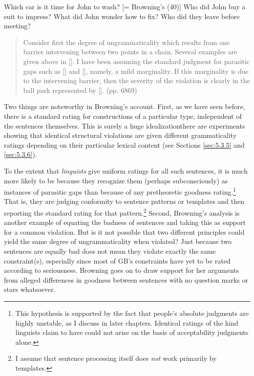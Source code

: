    
\label{ex:2:12}
\z

\ea \label{ex:2:13}
\ea
Which car is it time for John to wash? [= Browning's (40)]
\ex Who did John buy a suit to impress?
\ex What did John wonder how to fix?
\ex Who did they leave before meeting?\\
\z
\z

\begin{quote}
Consider first the degree of ungrammaticality which results from one barrier intervening between two points in a chain. Several examples are given above in []. I have been assuming the standard judgment for parasitic gaps such as [] and [], namely, a mild marginality. If this marginality is due to the intervening barrier, then the severity of the violation is clearly in the ball park represented by []. (pp. 68\textendash{}69)
\end{quote}

\noindent
Two things are noteworthy in Browning's account. First, as we have seen before, there is a standard rating for constructions of a particular type, independent of the sentences themselves. This is surely a huge idealization\schdash{}there are experiments showing that identical structural violations are given different grammaticality ratings depending on their particular lexical content (see Sections \ref{sec:5.3.5} and \ref{sec:5.3.6}).


To the extent that \textit{linguists} give uniform ratings for all such sentences, it is much more likely to be because they recognize them (perhaps subconsciously) as instances of parasitic gaps than because of any pretheoretic goodness rating.\footnote{This hypothesis is supported by the fact that people's absolute judgments are highly unstable, as I discuss in later chapters. Identical ratings of the kind linguists claim to have could not arise on the basis of acceptability judgments alone.}
 That is, they are judging conformity to sentence patterns or templates and then reporting the standard rating for that pattern.\footnote{I assume that sentence processing itself does \textit{not} work primarily by templates.} Second, Browning's analysis is another example of equating the badness of sentences and taking this as support for a common violation. But is it not possible that two different principles could yield the same degree of ungrammaticality when violated? Just because two sentences are equally bad does not mean they violate exactly the same constraint(s), especially since most of GB's constraints have yet to be rated according to seriousness. Browning goes on to draw support for her arguments from alleged differences in goodness between sentences with no question marks or stars whatsoever.

